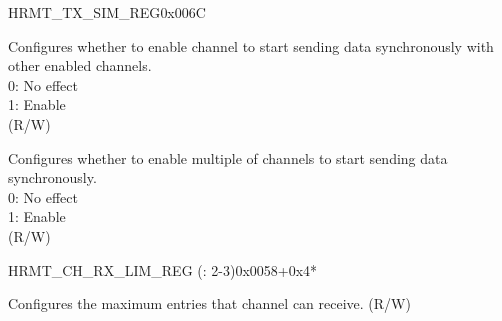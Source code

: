 \begin{register}{H}{RMT\_TX\_SIM\_REG}{0x006C}\label{regdesc:RMTTXSIMREG}
%
%
%
%
\regnewline%
\begin{regdesc}\begin{reglist}
\label{fielddesc:RMTTXSIMCHN}\item [RMT\_TX\_SIM\_CH\regindex{n}] Configures whether to enable channel  to start sending data synchronously with other enabled channels. \\
0: No effect\\
1: Enable\\
(R/W)
\label{fielddesc:RMTTXSIMEN}\item [RMT\_TX\_SIM\_EN] Configures whether to enable multiple of channels to start sending data synchronously. \\
0: No effect\\
1: Enable\\
(R/W)
\end{reglist}\end{regdesc}
\end{register}


\begin{register}{H}{RMT\_CH\_RX\_LIM\_REG (: 2-3)}{0x0058+0x4*}\label{regdesc:RMTCHMRXLIMREG}
%
%
\regnewline%
\begin{regdesc}\begin{reglist}
\label{fielddesc:RMTRXLIMCHM}\item [RMT\_RX\_LIM\_CH\regindex{m}] Configures the maximum entries that channel  can receive. (R/W)
\end{reglist}\end{regdesc}
\end{register}



